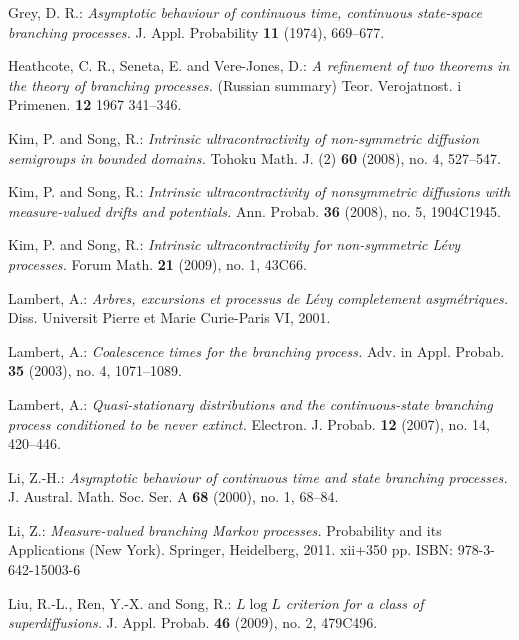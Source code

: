 \documentclass[12pt,a4paper]{amsart}
\numberwithin{equation}{section}
\theoremstyle{plain}
\theoremstyle{definition}
\theoremstyle{remark}
\begin{document}
\begin{thebibliography}{99}
Grey, D. R.:
\emph{Asymptotic behaviour of continuous time, continuous state-space branching processes.}
J. Appl. Probability \textbf{11} (1974), 669--677.

Heathcote, C. R., Seneta, E. and Vere-Jones, D.:
\emph{A refinement of two theorems in the theory of branching processes.} (Russian summary)
Teor. Verojatnost. i Primenen. \textbf{12} 1967 341--346.

Kim, P. and Song, R.:
\emph{Intrinsic ultracontractivity of non-symmetric diffusion semigroups in bounded domains.}
Tohoku Math. J. (2) \textbf{60} (2008), no. 4, 527--547.

Kim, P. and Song, R.:
\emph{Intrinsic ultracontractivity of nonsymmetric diffusions with measure-valued drifts and potentials.}
Ann. Probab. \textbf{36} (2008), no. 5, 1904C1945.

Kim, P. and Song, R.:
\emph{Intrinsic ultracontractivity for non-symmetric L\'evy processes.}
Forum Math. \textbf{21} (2009), no. 1, 43C66.

Lambert, A.:
\emph{Arbres, excursions et processus de L\'evy completement asym\'etriques.}
Diss. Universit Pierre et Marie Curie-Paris VI, 2001.

Lambert, A.:
\emph{Coalescence times for the branching process.}
Adv. in Appl. Probab. \textbf{35} (2003), no. 4, 1071--1089.

Lambert, A.:
\emph{Quasi-stationary distributions and the continuous-state branching process conditioned to be never extinct.}
Electron. J. Probab. \textbf{12} (2007), no. 14, 420--446.

Li, Z.-H.:
\emph{Asymptotic behaviour of continuous time and state branching processes.}
J. Austral. Math. Soc. Ser. A \textbf{68} (2000), no. 1, 68--84.

Li, Z.:
\emph{Measure-valued branching Markov processes.}
Probability and its Applications (New York). Springer, Heidelberg, 2011. xii+350 pp. ISBN: 978-3-642-15003-6

Liu, R.-L., Ren, Y.-X. and Song, R.:
\emph{{$L \log L$} criterion for a class of superdiffusions.}
J. Appl. Probab. \textbf{46} (2009), no. 2, 479C496.


\end{thebibliography}
\end{document}
